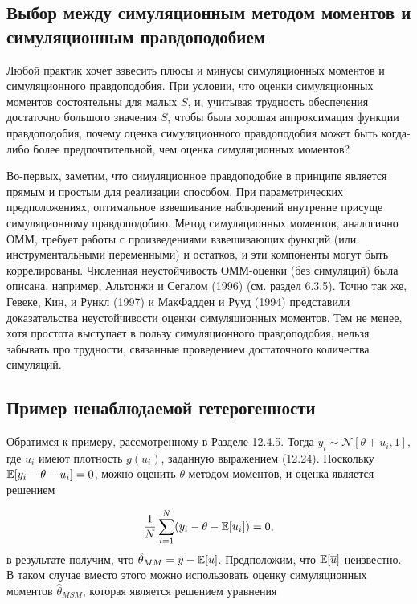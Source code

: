\subsection{Выбор между симуляционным методом моментов и симуляционным правдоподобием}

Любой практик хочет взвесить плюсы и минусы симуляционных моментов и симуляционного правдоподобия. При условии, что оценки симуляционных моментов состоятельны для малых $S$, и, учитывая трудность обеспечения достаточно большого значения $S$, чтобы была хорошая аппроксимация функции правдоподобия, почему оценка симуляционного правдоподобия может быть когда-либо более предпочтительной, чем оценка симуляционных моментов?

Во-первых, заметим, что симуляционное правдоподобие в принципе является прямым и простым для реализации способом. При параметрических предположениях, оптимальное взвешивание наблюдений внутренне присуще симуляционному правдоподобию. Метод симуляционных моментов, аналогично ОММ, требует работы с произведениями взвешивающих функций (или инструментальными переменными) и остатков, и эти компоненты могут быть коррелированы. Численная неустойчивость ОММ-оценки (без симуляций) была описана, например, Альтонжи и Сегалом (1996) (см. раздел 6.3.5). Точно так же, Гевеке, Кин, и Рункл (1997) и МакФадден и Рууд (1994) представили доказательства неустойчивости оценки симуляционных моментов. Тем не менее, хотя простота выступает в пользу симуляционного правдоподобия, нельзя забывать про трудности, связанные проведением достаточного количества симуляций.

\subsection{Пример ненаблюдаемой гетерогенности}

Обратимся к примеру, рассмотренному в Разделе 12.4.5. Тогда $y_i{\sim }\mathcal{N}[\theta+u_i,1]$, где $u_i$ имеют плотность $g(u_i)$, заданную выражением (12.24). Поскольку $\mathbb{E}[y_i-\theta-u_i]=0$, можно оценить $\theta$ методом моментов, и оценка  является решением 

\begin{equation}
\dfrac{1}{N}\sum^{N}_{i=1}(y_i-\theta-\mathbb{E}[u_i])=0,
\end{equation}
в результате получим, что $\hat{\theta}_{MM}=\overline{y}-\mathbb{E}[\overline{u}]$. Предположим, что $\mathbb{E}[\overline{u}]$ неизвестно. В таком случае вместо этого можно использовать оценку симуляционных моментов $\hat{\theta}_{MSM}$, которая является решением уравнения

